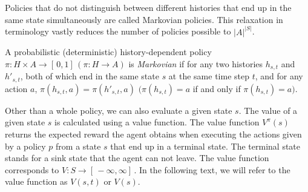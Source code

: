 Policies that do not distinguish between different histories that end up in the same state simultaneously are called Markovian policies. This relaxation in terminology vastly reduces the number of policies possible to $|A|^{|S|}$.






\begin{definition}
A probabilistic (deterministic) history-dependent policy $\pi: H \times A \rightarrow [ \,0, 1] \,(\pi: H \rightarrow A)$ is \textit{Markovian} if for any two histories $h_{s,t}$ and $h'_{s,t}$, both of which end in the same state $s$ at the same time step $t$, and for any action $a$, 
$\pi(h_{s,t}, a) = \pi(h'_{s,t}, a)$ $(\pi(h_{s,t}) = a$ if and only if $\pi(h_{s,t}) = a)$.
\end{definition}

Other than a whole policy, we can also evaluate a given state $s$. The value of a given state $s$ is calculated using a value function. The value function $V^{\pi}(s)$ returns the expected reward the agent obtains when executing the actions given by a policy $p$ from a state $s$ that end up in a terminal state. The terminal state stands for a sink state that the agent can not leave. The value function corresponds to $V: S \rightarrow [ \,-\infty, \infty] \,$. In the following text, we will refer to the value function as $V(s, t)$ or $V(s)$.


